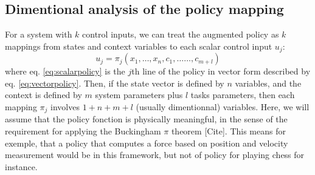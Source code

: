 \subsection{Dimentional analysis of the policy mapping}

For a system with $k$ control inputs, we can treat the augmented policy as $k$ mappings from states and context variables to each scalar control input $u_j$:
\begin{equation}
u_j = \pi_j \left(
x_1, \hdots, x_n, 
c_1, \hdots \hdots, c_{m+l}
\right) 
\label{eq:scalarpolicy}
\end{equation}
where eq. \eqref{eq:scalarpolicy} is the $j$th line of the policy in vector form described by eq. \eqref{eq:vectorpolicy}.
Then, if the state vector is defined by $n$ variables, and the context is defined by $m$ system parameters plus $l$ tasks parameters, then each mapping $\pi_j$ involves $1 + n + m + l$ (usually dimentionnal) variables. Here, we will assume that the policy fonction is physically meaningful, in the sense of the requirement for applying the Buckingham $\pi$ theorem [Cite]. This means for exemple, that a policy that computes a force based on position and velocity measurement would be in this framework, but not of policy for playing chess for instance. 

